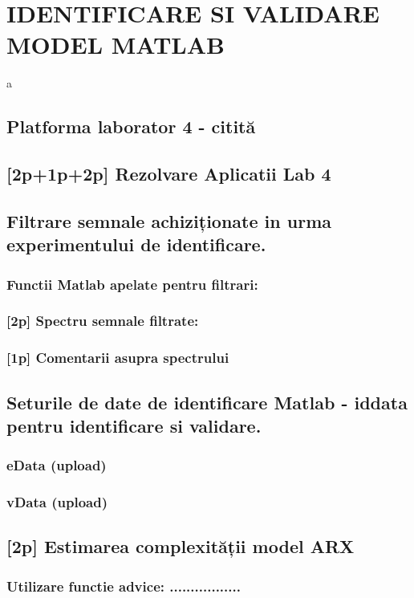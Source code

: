 \documentclass[12pt,english]{article}
\begin{document}
\section { IDENTIFICARE SI VALIDARE MODEL MATLAB }
a
\subsection { Platforma laborator 4 - citită                                  }
\subsection { [2p+1p+2p] Rezolvare Aplicatii Lab 4 }
\subsection { Filtrare semnale achiziționate in urma experimentului de identificare. }
\subsubsection { Functii Matlab apelate pentru filtrari: }
\subsubsection { [2p] Spectru semnale filtrate: }
\subsubsection { [1p] Comentarii asupra spectrului }
\subsection { Seturile de date de identificare Matlab - iddata pentru identificare si validare. }
\subsubsection { eData  (upload) }
\subsubsection { vData  (upload) }
\subsection { [2p] Estimarea complexității model ARX }
\subsubsection { Utilizare functie advice: ................. }
\end{document}
